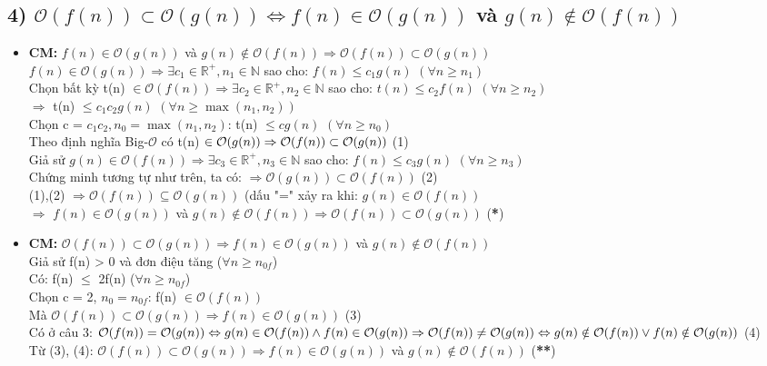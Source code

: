 \documentclass[10pt,a4paper]{article}
\begin{document}
\subsection*{4) $\mathcal{O}(f(n)) \subset \mathcal{O}(g(n)) \Leftrightarrow f(n) \in \mathcal{O}(g(n))$ và $g(n) \notin \mathcal{O}(f(n))$}
\begin{itemize}
    \item \textbf{CM: }$f(n) \in \mathcal{O}(g(n))$ và $g(n) \notin \mathcal{O}(f(n))\Rightarrow \mathcal{O}(f(n)) \subset \mathcal{O}(g(n))$\\
    $f(n) \in \mathcal{O}(g(n)) \Rightarrow \exists c_1 \in \mathbb{R^+},n_1 \in \mathbb{N}$ sao cho: $f(n) \leq c_1g(n)$ $(\forall n \geq n_1)$\\
    Chọn bất kỳ t(n) $\in \mathcal{O}(f(n)) \Rightarrow \exists c_2 \in \mathbb{R^+},n_2 \in \mathbb{N}$ sao cho: $t(n) \leq c_2f(n)$ $(\forall n \geq n_2)$ \\
    $\Rightarrow$ t(n) $\leq c_1c_2g(n)$ $(\forall n \geq \max(n_1,n_2))$ \\
    Chọn c = $c_1c_2, n_0 = \max(n_1,n_2)$: t(n) $\leq cg(n)$ $(\forall n \geq n_0)$ \\
    Theo định nghĩa Big-$\mathcal{O}$ có t(n) $\in \mathcal{O}(g(n)) \\
    \Rightarrow \mathcal{O}(f(n)) \subset \mathcal{O}(g(n))$ (1)\\ 
    Giả sử $g(n) \in \mathcal{O}(f(n)) \Rightarrow \exists c_3 \in \mathbb{R^+},n_3 \in \mathbb{N}$ sao cho: $f(n) \leq c_3g(n)$ $(\forall n \geq n_3)$\\ 
    Chứng minh tương tự như trên, ta có: $\Rightarrow \mathcal{O}(g(n)) \subset \mathcal{O}(f(n))$ (2) \\
    (1),(2) $\Rightarrow \mathcal{O}(f(n)) \subseteq \mathcal{O}(g(n))$ (dấu "=" xảy ra khi: $g(n) \in \mathcal{O}(f(n))$ \\
    $\Rightarrow$ $f(n) \in \mathcal{O}(g(n))$ và $g(n) \notin \mathcal{O}(f(n))\Rightarrow \mathcal{O}(f(n)) \subset \mathcal{O}(g(n))$ (\textbf{*})
    \item \textbf{CM: }$\mathcal{O}(f(n)) \subset \mathcal{O}(g(n)) \Rightarrow f(n) \in \mathcal{O}(g(n))$ và $g(n) \notin \mathcal{O}(f(n))$\\
    Giả sử f(n) > 0 và đơn điệu tăng ($\forall n \geq n_{0f}$)\\
    Có: f(n) $\leq$ 2f(n) ($\forall n \geq n_{0f}$) \\
    Chọn c = 2, $n_0 = n_{0f}$: f(n) $\in \mathcal{O}(f(n))$ \\
    Mà $\mathcal{O}(f(n)) \subset \mathcal{O}(g(n)) \Rightarrow f(n) \in \mathcal{O}(g(n))$ (3)\\ 
    Có ở câu 3: $\mathcal{O}(f(n)) = \mathcal{O}(g(n)) \Leftrightarrow g(n) \in \mathcal{O}(f(n)) \wedge f(n) \in \mathcal{O}(g(n)) \\
    \Rightarrow \mathcal{O}(f(n)) \ne \mathcal{O}(g(n)) \Leftrightarrow g(n) \notin \mathcal{O}(f(n)) \vee f(n) \notin \mathcal{O}(g(n))$ (4) \\
    Từ (3), (4): $\mathcal{O}(f(n)) \subset \mathcal{O}(g(n)) \Rightarrow f(n) \in \mathcal{O}(g(n))$ và $g(n) \notin \mathcal{O}(f(n))$ (\textbf{**})
\end{itemize}
\end{document}
